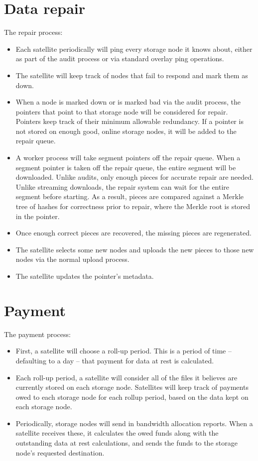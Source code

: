 \documentclass[11pt,fleqn,openany]{book}
\begin{document}
\section{Data repair}

The repair process:

\begin{itemize}
\item Each satellite periodically will ping every storage node it knows
about, either as part of the audit process or via standard overlay ping operations.
\item The satellite will keep track of nodes that fail to respond and mark
  them as down.
\item When a node is marked down or is marked bad via the audit process, the
  pointers that point to that storage node will be considered for repair.
  Pointers
  keep track of their minimum allowable redundancy. If a pointer is not stored
  on enough good, online storage nodes, it will be added to the repair queue.
\item A worker process will take segment pointers off the repair queue. When
  a segment pointer is taken off the repair queue, the entire segment will be
  downloaded. Unlike audits, only enough pieces for accurate repair are needed.
  Unlike streaming downloads, the repair system can wait for the entire segment
  before starting. As a result, pieces are compared against a Merkle tree of
  hashes for correctness prior to repair, where the Merkle root is stored in
  the pointer.
\item Once enough correct pieces are recovered, the missing pieces are
  regenerated.
\item The satellite selects some new nodes and uploads the new pieces to
  those new nodes via the normal upload process.
\item The satellite updates the pointer's metadata.
\end{itemize}

\section{Payment}

The payment process:

\begin{itemize}
\item First, a satellite will choose a roll-up period. This is a period of
  time -- defaulting to a day -- that payment for data at rest is calculated.
\item Each roll-up period, a satellite will consider all of the files it
  believes are currently stored on each storage node. Satellites will keep track
of payments owed to each storage node for each rollup period, based on
the data kept on each storage node.
\item Periodically, storage nodes will send in bandwidth allocation reports.
When a
  satellite receives these, it calculates the owed funds along with the
  outstanding data at rest calculations, and sends the funds to the storage
  node's requested destination.
\end{itemize}
\end{document}
